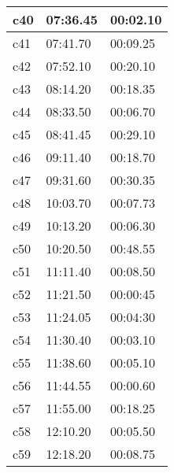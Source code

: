 \documentclass[a4paper,10pt]{report}
\begin{document}
\begin{longtable}[|c|]{|l|l|l|}
    c40                             & 07:36.45                        & 00:02.10 \\ \hline    
    c41                             & 07:41.70                        & 00:09.25 \\ \hline
    c42                             & 07:52.10                        & 00:20.10 \\ \hline
    c43                             & 08:14.20                        & 00:18.35 \\ \hline
    c44                             & 08:33.50                        & 00:06.70 \\ \hline
    c45                             & 08:41.45                        & 00:29.10 \\ \hline
    c46                             & 09:11.40                        & 00:18.70 \\ \hline
    c47                             & 09:31.60                        & 00:30.35 \\ \hline
    c48                             & 10:03.70                        & 00:07.73 \\ \hline
    c49                             & 10:13.20                        & 00:06.30 \\ \hline
    c50                             & 10:20.50                        & 00:48.55 \\ \hline
    c51                             & 11:11.40                        & 00:08.50 \\ \hline
    c52                             & 11:21.50                        & 00:00:45 \\ \hline
    c53                             & 11:24.05                        & 00:04:30 \\ \hline
    c54                             & 11:30.40                        & 00:03.10 \\ \hline
    c55                             & 11:38.60                        & 00:05.10 \\ \hline
    c56                             & 11:44.55                        & 00:00.60 \\ \hline
    c57                             & 11:55.00                        & 00:18.25 \\ \hline
    c58                             & 12:10.20                        & 00:05.50 \\ \hline
    c59                             & 12:18.20                        & 00:08.75 \\ \hline

\end{longtable}
\end{document}
